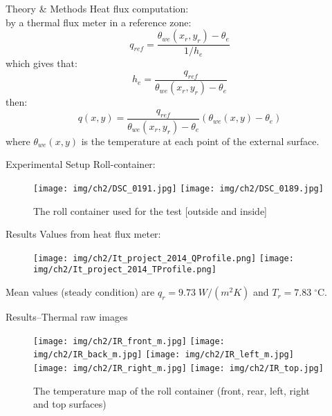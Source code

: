 \begin{frame}{Theory \& Methods}
    Heat flux computation:\\ 
    by a thermal flux meter in a reference zone:
    \begin{equation*}
        q_{ref} = \frac{\theta_{we}(x_r,y_r)-\theta_e}{1/h_e}
    \end{equation*}
    which gives that:
    \begin{equation*}
        h_e = \frac{q_{ref}}{\theta_{we}(x_r,y_r)-\theta_e}
    \end{equation*}
    then:
    \pause
    \begin{equation*}
        q(x,y) = \frac{q_{ref}}{\theta_{we}(x_r,y_r)-\theta_e}(\theta_{we}(x,y)-\theta_e)
    \end{equation*}
    where $\theta_{we}(x,y)$ is the temperature at each point of the external surface.    
\end{frame}


\begin{frame}{Experimental Setup}
Roll-container:
    \begin{figure}[!htbp]
        \centering
        \texttt{[image: img/ch2/DSC\_0191.jpg]}
        \texttt{[image: img/ch2/DSC\_0189.jpg]}
        \caption{The roll container used for the test [outside and inside]}
    \end{figure}
\end{frame}


\begin{frame}{Results}
Values from heat flux meter:
    \begin{figure}
        \hspace*{-18pt}
        \texttt{[image: img/ch2/It\_project\_2014\_QProfile.png]}
        \texttt{[image: img/ch2/It\_project\_2014\_TProfile.png]}
    \end{figure}
    \centering
    \small{Mean values (steady condition) are $q_r=9.73\; W/(m^2 K)$ and $T_r = 7.83\; ^\circ$C.}
\end{frame}


\begin{frame}{Results--\small{Thermal raw images}}
    \begin{figure}
        \vspace*{-5pt}
        \centering
        \texttt{[image: img/ch2/IR\_front\_m.jpg]}
        \hspace{5pt}
        \texttt{[image: img/ch2/IR\_back\_m.jpg]}
        \texttt{[image: img/ch2/IR\_left\_m.jpg]}
        \hspace{5pt}
        \texttt{[image: img/ch2/IR\_right\_m.jpg]}
        \texttt{[image: img/ch2/IR\_top.jpg]}
        \vspace*{-5pt}
        \caption{\footnotesize{The temperature map of the roll container (front, rear, left, right and top surfaces)}}
    \end{figure}
\end{frame}

